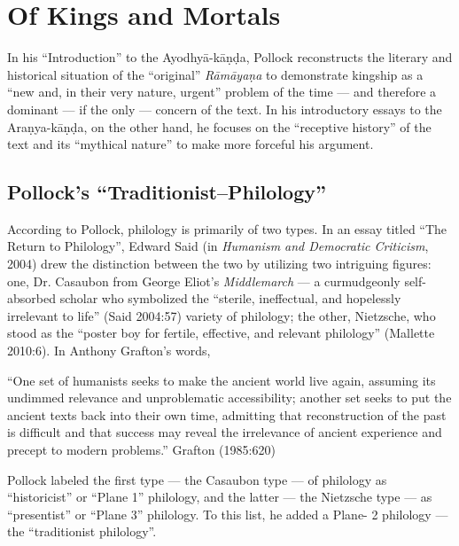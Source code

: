 \chapter{Of Kings and Mortals}\label{chapter2} 


In his “Introduction” to the Ayodhyā-kāṇḍa, Pollock reconstructs the literary and historical situation of the “original” {\sl Rāmāyaṇa} to demonstrate kingship as a “new and, in their very nature, urgent” problem of the time --- and therefore a dominant --- if the only --- concern of the text. In his introductory essays to the Araṇya-kāṇḍa, on the other hand, he focuses on the “receptive history” of the text and its “mythical nature” to make more forceful his argument.

\section{Pollock’s “Traditionist–Philology”}\label{sec2.1}

According to Pollock, philology is primarily of two types. In an essay titled ``The Return to Philology'', Edward Said (in {\sl Humanism and Democratic Criticism}, 2004) drew the distinction between the two by utilizing two intriguing figures: one, Dr. Casaubon from George Eliot’s {\sl Middlemarch} --- a curmudgeonly self-absorbed scholar who symbolized the “sterile, ineffectual, and hopelessly irrelevant to life” (Said 2004:57) variety of philology; the other, Nietzsche, who stood as the “poster boy for fertile, effective, and relevant philology” (Mallette 2010:6).   In Anthony Grafton’s words, 

\begin{myquote}
“One set of humanists seeks to make the ancient world live again, assuming its undimmed relevance and unproblematic accessibility; another set seeks to put the ancient texts back into their own time, admitting that reconstruction of the past is difficult and that success may reveal the irrelevance of ancient experience and precept to modern problems.” 
\hfill	Grafton (1985:620)
\end{myquote}

Pollock labeled the first type --- the Casaubon type --- of philology as “historicist” or “Plane 1” philology, and the latter --- the Nietzsche type --- as “presentist” or “Plane 3” philology. To this list, he added a Plane- 2 philology --- the “traditionist philology”. 

